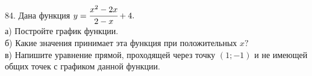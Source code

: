84. Дана функция $y=\cfrac{x^2-2x}{2-x}+4.$\\
а) Постройте график функции.\\
б) Какие значения принимает эта функция при положительных $x?$\\
в) Напишите уравнение прямой, проходящей через точку $(1;-1)$ и не имеющей общих точек с графиком данной функции.\\
